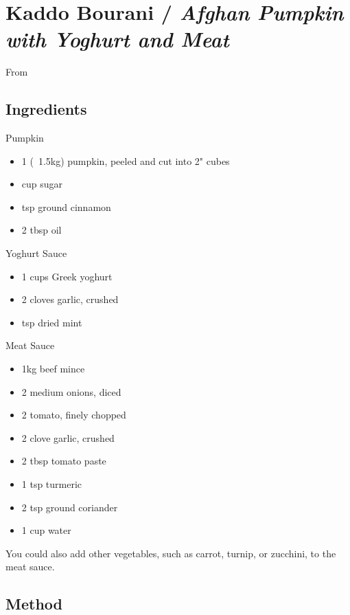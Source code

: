 \clearpage
\section{Kaddo Bourani / \emph{Afghan Pumpkin with Yoghurt and Meat}}


From 

\subsection{Ingredients}

Pumpkin

\begin{itemize}
	\item 1 (~1.5kg) pumpkin, peeled and cut into 2" cubes
	\item {} cup sugar
	\item {} tsp ground cinnamon
	\item 2 tbsp oil
\end{itemize}

Yoghurt Sauce

\begin{itemize}
	\item 1 cups Greek yoghurt
	\item 2 cloves garlic, crushed
	\item {} tsp dried mint
\end{itemize}

Meat Sauce

\begin{itemize}
    \item 1kg beef mince
    \item 2 medium onions, diced
    \item 2 tomato, finely chopped
    \item 2 clove garlic, crushed
    \item 2 tbsp tomato paste
    \item 1 tsp turmeric
    \item 2 tsp ground coriander
    \item 1 cup water
\end{itemize}

You could also add other vegetables, such as carrot, turnip, or zucchini, to the meat sauce.

\subsection{Method}

